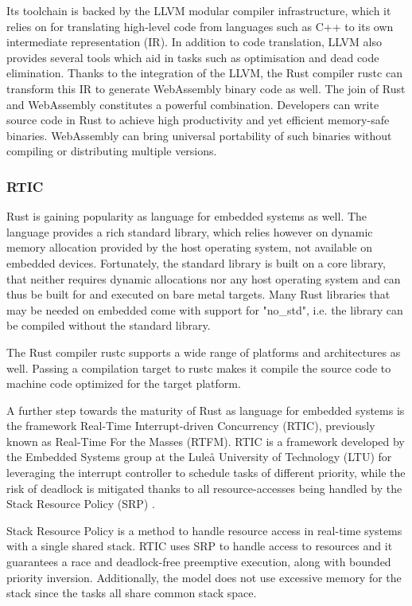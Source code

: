 Its toolchain is backed by the LLVM modular compiler infrastructure, which it relies on for translating high-level code from languages such as C++ to its own intermediate representation (IR). In addition to code translation, LLVM also provides several tools which aid in tasks such as optimisation and dead code elimination. Thanks to the integration of the LLVM, the Rust compiler rustc can transform this IR to generate WebAssembly binary code as well. The join of Rust and WebAssembly constitutes a powerful combination. Developers can write source code in Rust to achieve high productivity and yet efficient memory-safe binaries. WebAssembly can bring universal portability of such binaries without compiling or distributing multiple versions. 

\subsubsection{RTIC}

Rust is gaining popularity as language for embedded systems as well. The language provides a rich standard library, which relies however on dynamic memory allocation provided by the host operating system, not available on embedded devices. Fortunately, the standard library is built on a core library, that neither requires dynamic allocations nor any host operating system and can thus be built for and executed on bare metal targets. Many Rust libraries that may be needed on embedded come with support for "no\_std", i.e. the library can be compiled without the standard library. 

The Rust compiler rustc supports a wide range of platforms and architectures as well. Passing a compilation target to rustc makes it compile the source code to machine code optimized for the target platform.

A further step towards the maturity of Rust as language for embedded systems is the framework Real-Time Interrupt-driven Concurrency (RTIC), previously known as Real-Time For the Masses (RTFM). RTIC is a framework developed by the Embedded Systems group at the Luleå University of Technology (LTU) for leveraging the interrupt controller to schedule tasks of different priority, while the risk of deadlock is mitigated thanks to all resource-accesses being handled by the Stack Resource Policy (SRP) \cite{stack-resource-policy}.

Stack Resource Policy is a method to handle resource access in real-time systems with a single shared stack. RTIC uses SRP to handle access to resources and it guarantees a race and deadlock-free preemptive execution, along with bounded priority inversion. Additionally, the model does not use excessive memory for the stack since the tasks all share common stack space.

